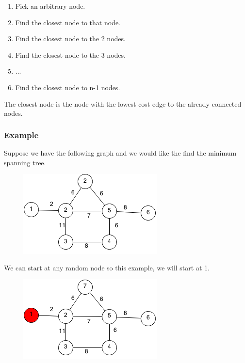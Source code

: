 \documentclass[11pt,oneside]{book}
\makeatletter
\def\maxwidth#1{\ifdim\Gin@nat@width>#1 #1\else\Gin@nat@width\fi}
\makeatother
\begin{document}
\begin{enumerate}
\item Pick an arbitrary node.
\item Find the closest node to that node.
\item Find the closest node to the 2 nodes.
\item Find the closest node to the 3 nodes.
\item ...
\item Find the closest node to n-1 nodes.
\end{enumerate}

The closest node is the node with the lowest cost edge to the already connected nodes.

\subsubsection{Example}

Suppose we have the following graph and we would like the find the minimum spanning tree.

\vspace{5px}\begin{figure}[H]\centering
        \includegraphics[width=0.66\maxwidth{\textwidth}]{prim.png}
        \end{figure}

We can start at any random node so this example, we will start at 1.

\vspace{5px}\begin{figure}[H]\centering
        \includegraphics[width=0.66\maxwidth{\textwidth}]{prim1.png}
        \end{figure}
\end{document}
